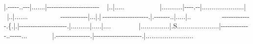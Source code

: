 \allowbreak{}|.-{}-{}-{}-{}-{}..-{}-{}-{}\allowbreak{}|.......\allowbreak{}|-{}-{}-{}-{}-{}-{}-{}-{}-{}-{}-{}-{}-{}-{}-{}-{}-{}-{}-{}-{}-{}-{}-{}{\mbox{$~$}}{\mbox{$~$}}{\mbox{$~$}}{\mbox{$~$}}{\mbox{$~$}}\allowbreak{}|..\allowbreak{}|.....{\mbox{$~$}}{\mbox{$~$}}{\mbox{$~$}}{\mbox{$~$}}{\mbox{$~$}}{\mbox{$~$}}{\mbox{$~$}}{\mbox{$~$}}{\mbox{$~$}}{\mbox{$~$}}{\mbox{$~$}}{\mbox{$~$}}{\mbox{$~$}}{\mbox{$~$}}{\mbox{$~$}}{\mbox{$~$}}{\mbox{$~$}}{\mbox{$~$}}{\mbox{$~$}}$\text{ }$\newline{}
\allowbreak{}|...........\allowbreak{}|-{}-{}-{}-{}.-{}-{}\allowbreak{}|......................\allowbreak{}|{\mbox{$~$}}{\mbox{$~$}}{\mbox{$~$}}{\mbox{$~$}}{\mbox{$~$}}\allowbreak{}|..\allowbreak{}|.......{\mbox{$~$}}{\mbox{$~$}}{\mbox{$~$}}{\mbox{$~$}}{\mbox{$~$}}{\mbox{$~$}}{\mbox{$~$}}{\mbox{$~$}}{\mbox{$~$}}{\mbox{$~$}}{\mbox{$~$}}{\mbox{$~$}}{\mbox{$~$}}{\mbox{$~$}}{\mbox{$~$}}{\mbox{$~$}}{\mbox{$~$}}$\text{ }$\newline{}
-{}-{}-{}-{}-{}-{}-{}-{}-{}-{}-{}-{}\allowbreak{}|...\allowbreak{}|.\allowbreak{}|{\mbox{$~$}}-{}-{}-{}-{}-{}-{}-{}-{}-{}-{}-{}-{}-{}-{}-{}-{}-{}-{}-{}-{}.\allowbreak{}|.-{}-{}-{}-{}-{}-{}-{}..\allowbreak{}|.....\allowbreak{}|..{\mbox{$~$}}{\mbox{$~$}}{\mbox{$~$}}{\mbox{$~$}}{\mbox{$~$}}{\mbox{$~$}}{\mbox{$~$}}{\mbox{$~$}}{\mbox{$~$}}{\mbox{$~$}}{\mbox{$~$}}{\mbox{$~$}}{\mbox{$~$}}{\mbox{$~$}}{\mbox{$~$}}{\mbox{$~$}}$\text{ }$\newline{}
-{}-{}-{}-{}-{}-{}-{}-{}-{}-{}-{}-{}-{}.\{\footnotemark[97].\allowbreak{}|.\allowbreak{}|-{}-{}-{}-{}-{}-{}-{}-{}-{}-{}-{}-{}-{}-{}-{}-{}-{}-{}-{}-{}-{}.\allowbreak{}|..........\allowbreak{}|.....\allowbreak{}|....{\mbox{$~$}}{\mbox{$~$}}{\mbox{$~$}}{\mbox{$~$}}{\mbox{$~$}}{\mbox{$~$}}{\mbox{$~$}}{\mbox{$~$}}{\mbox{$~$}}{\mbox{$~$}}{\mbox{$~$}}{\mbox{$~$}}{\mbox{$~$}}{\mbox{$~$}}$\text{ }$\newline{}
\allowbreak{}|...............\allowbreak{}|.S\footnotemark[98]......................\allowbreak{}|-{}-{}-{}-{}-{}-{}-{}-{}-{}-{}-{}-{}-{}..-{}-{}-{}-{}-{}...{\mbox{$~$}}{\mbox{$~$}}{\mbox{$~$}}{\mbox{$~$}}{\mbox{$~$}}{\mbox{$~$}}{\mbox{$~$}}{\mbox{$~$}}{\mbox{$~$}}{\mbox{$~$}}{\mbox{$~$}}{\mbox{$~$}}$\text{ }$\newline{}
\allowbreak{}|.-{}-{}-{}-{}-{}-{}-{}-{}-{}-{}-{}-{}-{}-{}-{}.\allowbreak{}|-{}-{}-{}-{}-{}-{}-{}-{}-{}-{}-{}-{}-{}-{}-{}-{}-{}-{}-{}-{}-{}.\allowbreak{}|.........................{\mbox{$~$}}{\mbox{$~$}}{\mbox{$~$}}{\mbox{$~$}}{\mbox{$~$}}{\mbox{$~$}}{\mbox{$~$}}{\mbox{$~$}}{\mbox{$~$}}{\mbox{$~$}}$\text{ }$\newline{}
